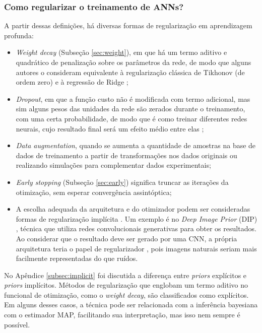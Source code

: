 \subsubsection{Como regularizar o treinamento de ANNs?}

A partir dessas definições, há diversas formas de regularização em aprendizagem profunda:
\begin{itemize}
\item \textit{Weight decay} (Subseção \ref{sec:weight}), em que há um termo aditivo e quadrático de penalização sobre os parâmetros da rede, de modo que alguns autores o consideram equivalente à regularização clássica de Tikhonov (de ordem zero) e à regressão de Ridge \cite{Chen2002};
\item \textit{Dropout}, em que a função custo não é modificada com termo adicional, mas sim alguns pesos das unidades da rede são zerados durante o treinamento, com uma certa probabilidade, de modo que é como treinar diferentes redes neurais, cujo resultado final será um efeito médio entre elas  \cite{nielsen2018, wei2020implicit}; 
\item \textit{Data augmentation}, quando se aumenta a quantidade de amostras na base de dados de treinamento a partir de transformações nos dados originais ou realizando simulações para complementar dados experimentais; 
\item \textit{Early stopping} (Subseção \ref{sec:early}) significa truncar as iterações da otimização, sem esperar convergência assintóptica; 
\item A escolha adequada da arquitetura e do otimizador podem ser consideradas formas de regularização implícita \cite[pág. 165]{Jakubovitz2019}. Um exemplo é no \textit{Deep Image Prior} (DIP) \cite{Ulyanov2020}, técnica que utiliza redes convolucionais generativas para obter os resultados. Ao considerar que o resultado deve ser gerado por uma CNN, a própria arquitetura teria o papel de regularizador \cite{Dittmer2019}, pois imagens naturais seriam mais facilmente representadas do que ruídos.  
\end{itemize}

No Apêndice \ref{subsec:implicit} foi discutida a diferença entre \textit{priors} explícitos e \textit{priors} implícitos. Métodos de regularização que englobam um termo aditivo no funcional de otimização, como o \textit{weight decay}, são classificados como explícitos.  Em alguns desses casos, a técnica pode ser relacionada com a inferência bayesiana com o estimador MAP, facilitando sua interpretação, mas isso nem sempre é possível.  

